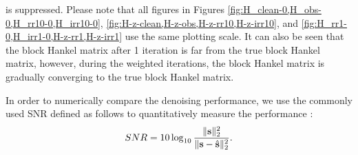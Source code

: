 is suppressed. Please note that all figures in Figures \ref{fig:H_clean-0,H_obs-0,H_rr10-0,H_irr10-0}, \ref{fig:H-z-clean,H-z-obs,H-z-rr10,H-z-irr10}, and \ref{fig:H_rr1-0,H_irr1-0,H-z-rr1,H-z-irr1} use the same plotting scale. It can also be seen that the block Hankel matrix after 1 iteration is far from the true block Hankel matrix, however, during the weighted  iterations, the block Hankel matrix is gradually converging to the true block Hankel matrix.

In order to numerically compare the denoising performance, we use the commonly used SNR defined as follows to quantitatively measure the performance \cite[]{yangkang2015ortho,wencheng2015asa,shuwei2015}:
\begin{equation}
\label{eq:dsnr}
SNR=10\log_{10}\frac{\Arrowvert \mathbf{s} \Arrowvert_2^2}{\Arrowvert \mathbf{s} -\hat{\mathbf{s}}\Arrowvert_2^2}.
\end{equation}
